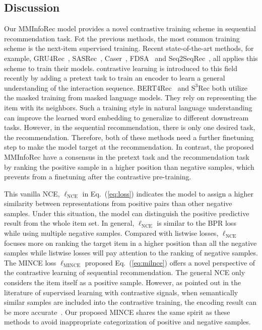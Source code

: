 \documentclass[conference]{IEEEtran}
\begin{document}
\subsection{Discussion}
\label{sec:discuss}
Our MMInfoRec model provides a novel contrastive training scheme in sequential recommendation task. Fot the previous methods, the most common training scheme is the next-item supervised training. Recent state-of-the-art methods, for example, GRU4Rec~\cite{gru4rec}, SASRec~\cite{sasrec}, Caser~\cite{caser}, FDSA~\cite{fdsa} and Seq2SeqRec~\cite{s2s}, all applies this scheme to train their models. contrastive learning is introduced to this field recently by adding a pretext task to train an encoder to learn a general understanding of the interaction sequence. BERT4Rec~\cite{bert4rec} and $\text{S}^3$Rec both utilize the masked training from masked language models. They rely on representing the item with its neighbors. Such a training style in natural language understanding can improve the learned word embedding to generalize to different downstream tasks. However, in the sequential recommendation, there is only one desired task, the recommendation. Therefore, both of these methods need a further finetuning step to make the model target at the recommendation. In contrast, the proposed MMInfoRec have a consensus in the pretext task and the recommendation task by ranking the positive sample in a higher position than negative samples, which prevents from a finetuning after the contrastive pre-training.

This vanilla NCE, $\ell_\text{NCE}$ in Eq.~(\ref{eq:loss}) indicates the model to assign a higher similarity between representations from positive pairs than other negative samples. Under this situation, the model can distinguish the positive predictive result from the whole item set. In general, $\ell_\text{NCE}$ is similar to the BPR loss~\cite{bprmf} while using multiple negative samples. Compared with listwise losses, $\ell_\text{NCE}$ focuses more on ranking the target item in a higher position than all the negative samples while listwise losses will pay attention to the ranking of negative samples. The MINCE loss $\ell_\text{MINCE}$ proposed Eq.~(\ref{eq:milnce}) offers a novel perspective of the contrastive learning of sequential recommendation. The general NCE only considers the item itself as a positive sample. However, as pointed out in the literature of supervised learning with contrastive signals, when semantically similar samples are included into the contrastive training, the encoding result can be more accurate~\cite{coclr,scl,milnce}. Our proposed MINCE shares the same spirit as these methods to avoid inappropriate categorization of positive and negative samples.
\end{document}
